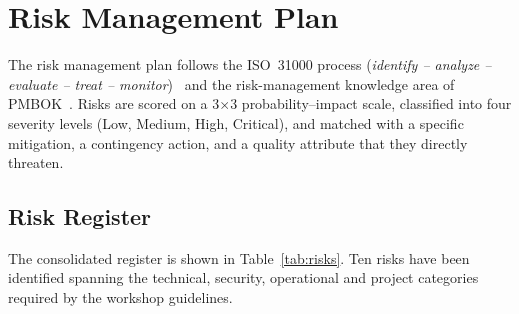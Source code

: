 \documentclass[conference,a4paper,10pt]{IEEEtran}
\begin{document}
\section{Risk Management Plan}
\label{sec:risk}

The risk management plan follows the ISO~31000 process (\emph{identify --
analyze -- evaluate -- treat -- monitor})~\cite{iso31000} and the
risk-management knowledge area of PMBOK~\cite{pmbok}. Risks are scored on a
3$\times$3 probability--impact scale, classified into four severity levels
(Low, Medium, High, Critical), and matched with a specific mitigation, a
contingency action, and a quality attribute that they directly threaten.

\subsection{Risk Register}

The consolidated register is shown in Table~\ref{tab:risks}. Ten risks have
been identified spanning the technical, security, operational and project
categories required by the workshop guidelines.
\end{document}
